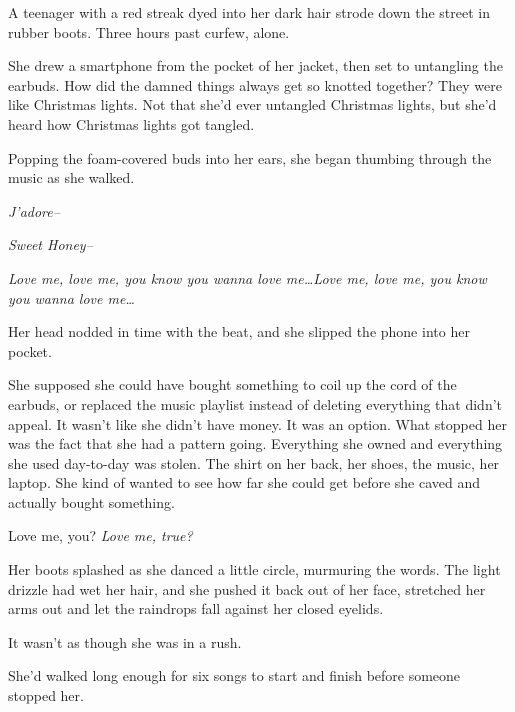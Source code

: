 





A teenager with a red streak dyed into her dark hair strode down the street in rubber boots.  Three hours past curfew, alone.



She drew a smartphone from the pocket of her jacket, then set to untangling the earbuds.  How did the damned things always get so knotted together?  They were like Christmas lights.  Not that she'd ever untangled Christmas lights, but she'd heard how Christmas lights got tangled.



Popping the foam-covered buds into her ears, she began thumbing through the music as she walked.



\emph{J'adore--}



\emph{Sweet Honey--}



\emph{Love me, love me, you know you wanna love me\ldots  Love me, love me, you know you wanna love me\ldots}



Her head nodded in time with the beat, and she slipped the phone into her pocket.



She supposed she could have bought something to coil up the cord of the earbuds, or replaced the music playlist instead of deleting everything that didn't appeal.  It wasn't like she didn't have money.  It was an option.  What stopped her was the fact that she had a pattern going.  Everything she owned and everything she used day-to-day was stolen.  The shirt on her back, her shoes, the music, her laptop.  She kind of wanted to see how far she could get before she caved and actually bought something.



Love me, you? \emph{Love me, true?}



Her boots splashed as she danced a little circle, murmuring the words.  The light drizzle had wet her hair, and she pushed it back out of her face, stretched her arms out and let the raindrops fall against her closed eyelids.



It wasn't as though she was in a rush.



She'd walked long enough for six songs to start and finish before someone stopped her.



